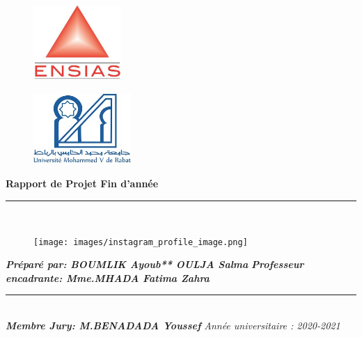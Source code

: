 \documentclass[a4paper,12pt]{report}
\begin{document}
\begin{titlepage}
\begin{center}
\begin{figure}[!h]
\vspace{- 2 cm}
\hspace{ 0 cm}
\includegraphics[width=9em]{images/ensias.jpeg}
\end{figure}
\begin{figure}[!h]
\vspace{- 3.97cm}
\hspace{14 cm}
\includegraphics[width=10em]{images/um5.jpeg}
\end{figure}
\end{center}

\begin{center}
\noindent \hspace{ 0.3 cm }\Huge \textbf{ Rapport de Projet  Fin d’année } 
\vspace*{0.1cm}

\vspace*{0.1cm}
\begin{center}
 \rule{0.9\linewidth}{1pt}
\end{center}
\begin{center}

\noindent {} \\ 
 \end{center} 


\vspace*{0.5cm} \noindent \hspace{ -0.5 cm} \large 
\begin{figure}[H]
    \begin{center}
    \texttt{[image: images/instagram\_profile\_image.png]}
    \end{center}
\end{figure}
\raggedright
{\textbf{\emph{Préparé par: BOUMLIK Ayoub** OULJA Salma}}}
\raggedleft
{\textbf{\emph{Professeur encadrante: Mme.MHADA Fatima Zahra}}}

\rule{0.7\linewidth}{2pt}\\
\raggedleft
{\textbf{\emph{Membre Jury: M.BENADADA Youssef
}}}
\Large \emph{Année universitaire : 2020-2021} 

\end{center}
\end{titlepage}
\end{document}
